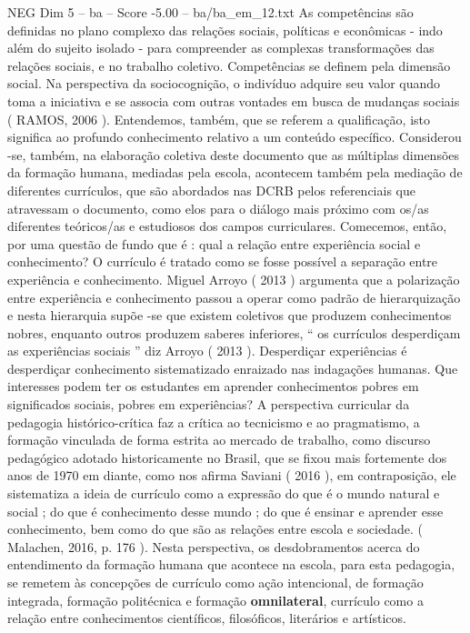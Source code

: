 \begin{textsample}{NEG Dim 5 – ba – Score -5.00 – ba/ba\_em\_12.txt}
As competências são definidas no plano complexo das relações sociais, políticas e econômicas - indo além do sujeito isolado - para compreender as complexas transformações das relações sociais, e no trabalho coletivo.
Competências se definem pela dimensão social.
Na perspectiva da sociocognição, o indivíduo adquire seu valor quando toma a iniciativa e se associa com outras vontades em busca de mudanças sociais ( RAMOS, 2006 ).
Entendemos, também, que se referem a qualificação, isto significa ao profundo conhecimento relativo a um conteúdo específico.
Considerou -se, também, na elaboração coletiva deste documento que as múltiplas dimensões da formação humana, mediadas pela escola, acontecem também pela mediação de diferentes currículos, que são abordados nas DCRB pelos referenciais que atravessam o documento, como elos para o diálogo mais próximo com os/as diferentes teóricos/as e estudiosos dos campos curriculares.
Comecemos, então, por uma questão de fundo que é : qual a relação entre experiência social e conhecimento?
O currículo é tratado como se fosse possível a separação entre experiência e conhecimento.
Miguel Arroyo ( 2013 ) argumenta que a polarização entre experiência e conhecimento passou a operar como padrão de hierarquização e nesta hierarquia supõe -se que existem coletivos que produzem conhecimentos nobres, enquanto outros produzem saberes inferiores, “ os currículos desperdiçam as experiências sociais ” diz Arroyo ( 2013 ).
Desperdiçar experiências é desperdiçar conhecimento sistematizado enraizado nas indagações humanas.
Que interesses podem ter os estudantes em aprender conhecimentos pobres em significados sociais, pobres em experiências?
A perspectiva curricular da pedagogia histórico-crítica faz a crítica ao tecnicismo e ao pragmatismo, a formação vinculada de forma estrita ao mercado de trabalho, como discurso pedagógico adotado historicamente no Brasil, que se fixou mais fortemente dos anos de 1970 em diante, como nos afirma Saviani ( 2016 ), em contraposição, ele sistematiza a ideia de currículo como a expressão do que é o mundo natural e social ; do que é conhecimento desse mundo ; do que é ensinar e aprender esse conhecimento, bem como do que são as relações entre escola e sociedade. ( Malachen, 2016, p. 176 ).
Nesta perspectiva, os desdobramentos acerca do entendimento da formação humana que acontece na escola, para esta pedagogia, se remetem às concepções de currículo como ação intencional, de formação integrada, formação politécnica e formação \textbf{omnilateral}, currículo como a relação entre conhecimentos científicos, filosóficos, literários e artísticos.

\end{textsample}
